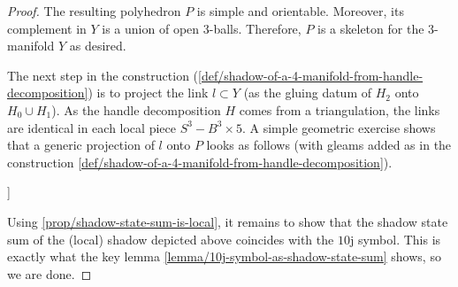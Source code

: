 \begin{proof}
  The resulting polyhedron $P$ is simple and orientable.
  Moreover, its complement in $Y$ is a union of open $3$-balls.
  Therefore, $P$ is a skeleton for the $3$-manifold $Y$ as
  desired.

  The next step in the construction
  (\ref{def/shadow-of-a-4-manifold-from-handle-decomposition}) is
  to project the link $l \subset Y$ (as the gluing datum of
  $H_{2}$ onto $H_{0} \cup H_{1}$). As the handle decomposition
  $H$ comes from a triangulation, the links are identical in each
  local piece $S^{3} - B^{3} \times 5$. A simple geometric
  exercise shows that a generic projection of $l$ onto $P$ looks
  as follows (with gleams added as in the construction
  \ref{def/shadow-of-a-4-manifold-from-handle-decomposition}).

  \noindent [TODO: Add graphic [20220217T143000 (1)]]

  Using \ref{prop/shadow-state-sum-is-local}, it remains to show
  that the shadow state sum of the (local) shadow depicted above
  coincides with the $10$j symbol. This is exactly what the key
  lemma \ref{lemma/10j-symbol-as-shadow-state-sum} shows, so we
  are done.

\end{proof}
